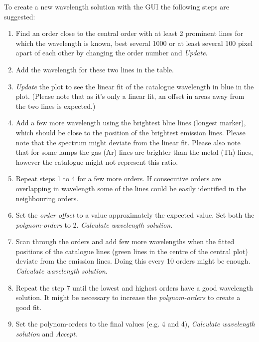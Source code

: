 \documentclass[10pt,a4paper]{article}
\begin{document}
To create a new wavelength solution with the GUI the following steps are suggested:
\begin{enumerate}\setlength\itemsep{0em}
  \item Find an order close to the central order with at least 2 prominent lines for which the wavelength is known, best several 1000 or at least several 100 pixel apart of each other by changing the order number and \textit{Update}.
  \item Add the wavelength for these two lines in the table.
  \item \textit{Update} the plot to see the linear fit of the catalogue wavelength in blue in the plot. (Please note that as it's only a linear fit, an offset in areas away from the two lines is expected.)
  \item Add a few more wavelength using the brightest blue lines (longest marker), which should be close to the position of the brightest emission lines. Please note that the spectrum might deviate from the linear fit. Please also note that for some lamps the gas (Ar) lines are brighter than the metal (Th) lines, however the catalogue might not represent this ratio.
  \item Repeat steps 1 to 4 for a few more orders. If consecutive orders are overlapping in wavelength some of the lines could be easily identified in the neighbouring orders.
  \item Set the \textit{order offset} to a value approximately the expected value. Set both the \textit{polynom-orders} to 2. \textit{Calculate wavelength solution}.
  \item Scan through the orders and add few more wavelengths when the fitted positions of the catalogue lines (green lines in the centre of the central plot) deviate from the emission lines. Doing this every 10 orders might be enough. \textit{Calculate wavelength solution}.
  \item Repeat the step 7 until the lowest and highest orders have a good wavelength solution. It might be necessary to increase the \textit{polynom-orders} to create a good fit.
  \item Set the polynom-orders to the final values (e.g. 4 and 4), \textit{Calculate wavelength solution} and \textit{Accept}.
\end{enumerate}
\end{document}
